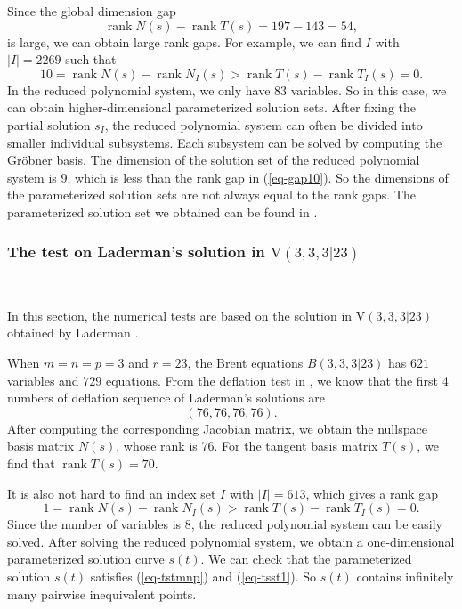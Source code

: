 \documentclass[reqno]{amsart}
\theoremstyle{definition}
\numberwithin{equation}{section}
\theoremstyle{remark}
\begin{document}
Since the global dimension gap
$$\operatorname{rank}N(s)-\operatorname{rank}T(s)=197-143=54,$$
is large, we can obtain large rank gaps. For example, we can find $I$ with $|I|=2269$ such that
\begin{equation}\label{eq-gap10}
10=\operatorname{rank}N(s)-\operatorname{rank}N_I(s)>\operatorname{rank}T(s)-\operatorname{rank}T_I(s)=0.
\end{equation}
In the reduced polynomial system, we only have 83 variables. So in this case, we can obtain higher-dimensional parameterized solution sets. After fixing the partial solution $s_I$, the reduced polynomial system can often be divided into smaller individual subsystems. Each subsystem can be solved by computing the Gröbner basis. The dimension of the solution set of the reduced polynomial system is 9, which is less than the rank gap in (\ref{eq-gap10}). So the dimensions of the parameterized solution sets are not always equal to the rank gaps. The parameterized solution set we obtained can be found in \cite{L-23}.

\subsubsection{The test on Laderman's solution in $\mathrm{V}(3,3,3|23)$}
\

In this section, the numerical tests are based on the solution in $\mathrm{V}(3,3,3|23)$ obtained by Laderman \cite{Lad-76}. 

When $m=n=p=3$ and $r=23$, the Brent equations $B(3,3,3|23)$ has 
$621$ variables and $729$ equations.
From the deflation test in \cite{li25def}, we know that the first 4 numbers of deflation sequence of Laderman's solutions are
$$(76,76,76,76).$$
After computing the corresponding Jacobian matrix, we obtain the nullspace basis matrix $N(s)$, whose rank is $76$. For the tangent basis matrix $T(s)$, we find that $\operatorname{rank}T(s)=70$.

It is also not hard to find an index set $I$ with $|I|=613$, which gives a rank gap
\begin{equation*} 
1=\operatorname{rank}N(s)-\operatorname{rank}N_I(s)>\operatorname{rank}T(s)-\operatorname{rank}T_I(s)=0.
\end{equation*}
Since the number of variables is 8, the reduced polynomial system can be easily solved. After solving the reduced polynomial system, we obtain a one-dimensional parameterized solution curve $s(t)$. We can check that the parameterized solution $s(t)$ satisfies (\ref{eq-tstmnp}) and (\ref{eq-tsst1}). So $s(t)$ contains infinitely many pairwise inequivalent points.
\end{document}
